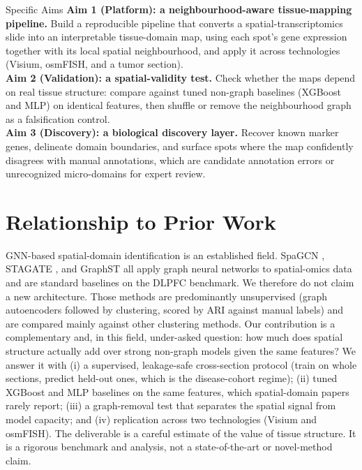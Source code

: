 \documentclass[11pt]{article}
\begin{document}
\begin{aimbox}{Specific Aims}
\textbf{Aim 1 (Platform): a neighbourhood-aware tissue-mapping pipeline.} Build a
reproducible pipeline that converts a spatial-transcriptomics slide into an
interpretable tissue-domain map, using each spot's gene expression together with
its local spatial neighbourhood, and apply it across technologies (Visium,
osmFISH, and a tumor section).\\
\textbf{Aim 2 (Validation): a spatial-validity test.} Check whether the maps
depend on real tissue structure: compare against tuned non-graph baselines
(XGBoost and MLP) on identical features, then shuffle or remove the neighbourhood
graph as a falsification control.\\
\textbf{Aim 3 (Discovery): a biological discovery layer.} Recover known marker
genes, delineate domain boundaries, and surface spots where the map confidently
disagrees with manual annotations, which are candidate annotation errors or
unrecognized micro-domains for expert review.
\end{aimbox}

\section{Relationship to Prior Work}

GNN-based spatial-domain identification is an established field. SpaGCN
\cite{hu2021}, STAGATE \cite{dong2022}, and GraphST \cite{long2023} all apply
graph neural networks to spatial-omics data and are standard baselines on the
DLPFC benchmark.
We therefore do not claim a new architecture. Those methods are predominantly
unsupervised (graph autoencoders followed by clustering, scored by ARI against
manual labels) and are compared mainly against other clustering methods. Our
contribution is a complementary and, in this field, under-asked question: how
much does spatial structure actually add over strong non-graph models given the
same features? We answer it with (i) a supervised, leakage-safe cross-section
protocol (train on whole sections, predict held-out ones, which is the
disease-cohort regime); (ii) tuned XGBoost and MLP baselines on the same features,
which spatial-domain papers rarely report; (iii) a graph-removal test that
separates the spatial signal from model capacity; and (iv) replication across two
technologies (Visium and osmFISH). The deliverable is a careful
estimate of the value of tissue structure. It is a rigorous benchmark and
analysis, not a state-of-the-art or novel-method claim.
\end{document}
